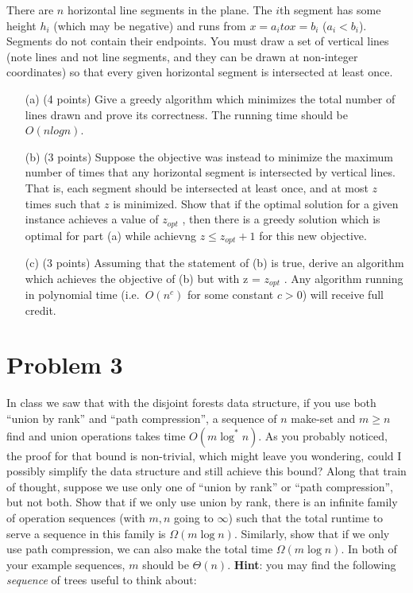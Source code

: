 \documentclass[12pt]{article}
\begin{document}
There are $n$ horizontal line segments in the plane. The $i$th segment has some height $h_i$ (which may be negative) and runs from $x = a_i to x = b_i$ ($a_i < b_i$). Segments do not contain their endpoints. You must draw a set of vertical lines (note lines and not line segments, and they can be drawn at non-integer coordinates) so that every given horizontal segment is intersected at least once.
\begin{itemize}
\item[(a)] (4 points) Give a greedy algorithm which minimizes the total number of lines drawn and prove its correctness. The running time should be $O(n log n)$.
\item[(b)] (3 points) Suppose the objective was instead to minimize the maximum number of times that any horizontal segment is intersected by vertical lines. That is, each segment should be intersected at least once, and at most $z$ times such that $z$ is minimized. Show that if the optimal solution for a given instance achieves a value of $z_{opt}$ , then there is a greedy solution which is optimal for part (a) while achievng $z \le z_{opt} + 1$ for this new objective.
\item[(c)] (3 points) Assuming that the statement of (b) is true, derive an algorithm which achieves the objective of (b) but with z = $z_{opt}$ . Any algorithm running in polynomial time (i.e.\ $O(n^c)$ for some constant $c>0$) will receive full credit.
\end{itemize}


\section*{Problem 3}

In class we saw that with the disjoint forests data structure, if you use both ``union by rank'' and ``path compression'', a sequence of $n$ make-set and $m\ge n$ find and union operations takes time $O(m\log^* n)$. As you probably noticed, the proof for that bound is non-trivial, which might leave you wondering, could I possibly simplify the data structure and still achieve this bound? Along that train of thought, suppose we use only one of ``union by rank'' or ``path compression'', but not both. Show that if we only use union by rank, there is an infinite family of operation sequences (with $m, n$ going to $\infty$) such that the total runtime to serve a sequence in this family is $\Omega(m\log n)$. Similarly, show that if we only use path compression, we can also make the total time $\Omega(m\log n)$. In both of your example sequences, $m$ should be $\Theta(n)$. \textbf{Hint}: you may find the following {\em sequence} of trees useful to think about:
\end{document}
